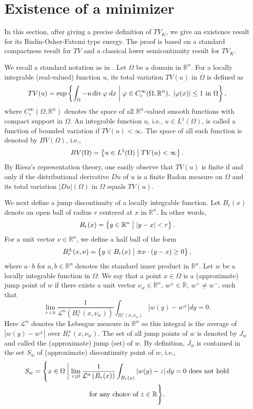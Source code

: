 \documentclass[11pt]{amsart} %
\numberwithin{equation}{section}
\begin{document}

\section{Existence of a minimizer} \label{SEx} %
In this section, after giving a precise definition of $TV_K$, we give an existence result for its Rudin-Osher-Fatemi type energy.
 The proof is based on a standard compactness result for $TV$ and a classical lower semicontinuity result for $TV_K$.

We recall a standard notation as in \cite{AFP}.
 Let $\Omega$ be a domain in $\mathbb{R}^n$.
 For a locally integrable (real-valued) function $u$, its total variation $TV(u)$ in $\Omega$  is defined as 
\[
	TV(u) = \sup \left\{ \int_\Omega - u \operatorname{div} \varphi\; dx \biggm|
	\varphi \in C_c^\infty(\Omega,\mathbb{R}^n),\ 
	\left| \varphi(x) \right| \leq 1\ \text{in}\ \Omega \right\},
\]
where $C_c^\infty(\Omega,\mathbb{R}^n)$ denotes the space of all $\mathbb{R}^n$-valued smooth functions with compact support in $\Omega$.
 An integrable function $u$, i.e., $u\in L^1(\Omega)$, is called a function of bounded variation if $TV(u)<\infty$.
 The space of all such function is denoted by $BV(\Omega)$, i.e.,
\[
	BV(\Omega) = \left\{ u \in L^1(\Omega) \bigm|
	TV(u) < \infty \right\}.
\]
By Riesz's representation theory, one easily observe that $TV(u)$ is finite if and only if the distributional derivative $Du$ of $u$ is a finite Radon measure on $\Omega$ and its total variation $|Du|(\Omega)$ in $\Omega$ equals $TV(u)$.

We next define a jump discontinuity of a locally integrable function.
 Let $B_r(x)$ denote an open ball of radius $r$ centered at $x$ in $\mathbb{R}^n$.
 In other words, 
\[
	B_r(x) = \left\{ y \in \mathbb{R}^n \bigm|
	| y - x | < r \right\}.
\]
For a unit vector $\nu\in\mathbb{R}^n$, we define a half ball of the form
\[
	B_r^\pm(x,\nu) = \left\{ y \in B_r(x) \bigm|
	\pm\nu \cdot ( y - x ) \geq 0 \right\},
\]
where $a\cdot b$ for $a,b\in\mathbb{R}^n$ denotes the standard inner product in $\mathbb{R}^n$.
 Let $w$ be a locally integrable function in $\Omega$.
 We say that a point $x\in\Omega$ is a (approximate) jump point of $w$ if there exists a unit vector $\nu_w\in\mathbb{R}^n$, $w^\pm\in\mathbb{R}$, $w^+\neq w^-$, such that
\[
	\lim_{r\downarrow0} \frac{1}{\mathcal{L}^n\left(B_r^\pm(x,\nu_w)\right)}
	\int_{B_r^\pm(x,\nu_w)} \left| w(y) - w^\pm \right| dy = 0.
\]
Here $\mathcal{L}^n$ denotes the Lebesgue measure in $\mathbb{R}^n$ so this integral is the average of $\left|w(y)-w^\pm\right|$ over $B_r^\pm(x,\nu_w)$.
 The set of all jump points of $w$ is denoted by $J_w$ and called the (approximate) jump (set) of $w$.
 By definition, $J_w$ is contained in the set $S_w$ of (approximate) discontinuity point of $w$, i.e.,
\begin{multline*}
	S_w = \Biggl\{ x \in \Omega \biggm|
	\lim_{r\downarrow0} \frac{1}{\mathcal{L}^n\left(B_r(x)\right)}
	\int_{B_r(x)} \left| w(y) - z \right| dy = 0\ \text{does not hold} \\
	\text{for any choice of}\ z \in \mathbb{R} \Biggr\}.
\end{multline*}
\end{document}
